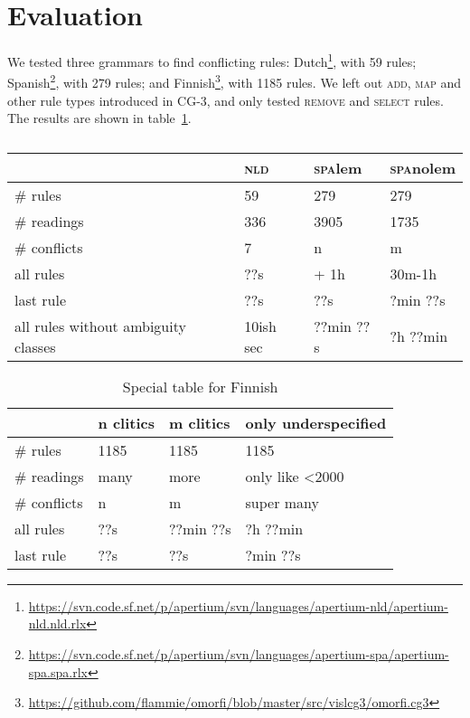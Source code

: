 \section{Evaluation}
\label{sec:eval}

We tested three grammars to find conflicting rules: 
Dutch\footnote{\url{https://svn.code.sf.net/p/apertium/svn/languages/apertium-nld/apertium-nld.nld.rlx}},
with 59 rules; 
Spanish\footnote{\url{https://svn.code.sf.net/p/apertium/svn/languages/apertium-spa/apertium-spa.spa.rlx}},
with 279 rules; and 
Finnish\footnote{\url{https://github.com/flammie/omorfi/blob/master/src/vislcg3/omorfi.cg3}},
with 1185 rules. We left out \textsc{add}, \textsc{map} and other rule
types introduced in CG-3, and only tested \textsc{remove} and \textsc{select} rules.
The results are shown in table~\ref{table:res}. 


\begin{table}[]
\centering
\begin{tabular}{|l|l|l|l|}

\hline
                   & \textsc{nld}  & \textsc{spa}lem  & \textsc{spa}nolem \\ \hline
\# rules           & 59            & 279       & 279     \\ \hline
\# readings        & 336           & 3905      & 1735    \\ \hline
\# conflicts       & 7             & n         & m    \\ \hline
\clock{} all rules & ??s           & + 1h      & 30m-1h   \\ \hline
\clock{} last rule & ??s           & ??s       & ?min ??s    \\ \hline
\clock{} all rules 
without ambiguity 
classes            & 10ish sec       & ??min ??s    & ?h ??min    \\ \hline


\end{tabular}
\caption{}
\label{table:res}
\end{table}

\begin{table}[]
\centering
\begin{tabular}{|l|l|l|l|}

\hline
              & n clitics & m clitics & only underspecified \\ \hline
\# rules      & 1185      & 1185      & 1185\\ \hline
\# readings   & many & more & only like <2000   \\ \hline
\# conflicts  & n   & m        & super many    \\ \hline
\clock{} all rules       & ??s              & ??min ??s    & ?h ??min    \\ \hline
\clock{} last rule       & ??s              & ??s          & ?min ??s    \\ \hline


\end{tabular}
\caption{Special table for Finnish}
\label{table:resFin}
\end{table}

